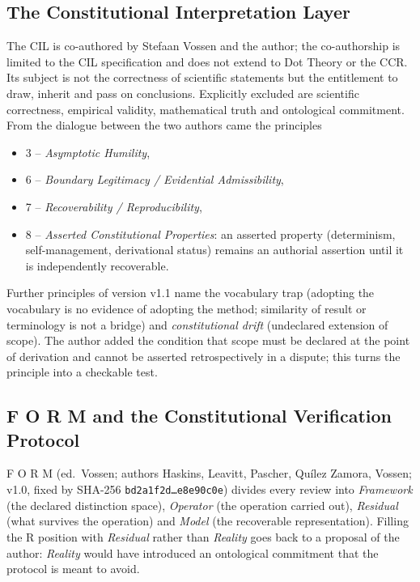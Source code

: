 \subsection{The Constitutional Interpretation Layer}

The CIL is co-authored by Stefaan Vossen and the author; the co-authorship is limited to
the CIL specification and does not extend to Dot Theory or the CCR. Its subject is not
the correctness of scientific statements but the entitlement to draw, inherit and pass on
conclusions. Explicitly excluded are scientific correctness, empirical validity,
mathematical truth and ontological commitment. From the dialogue between the two authors
came the principles
\begin{itemize}
\item 3 -- \emph{Asymptotic Humility},
\item 6 -- \emph{Boundary Legitimacy / Evidential Admissibility},
\item 7 -- \emph{Recoverability / Reproducibility},
\item 8 -- \emph{Asserted Constitutional Properties}: an asserted property (determinism,
  self-management, derivational status) remains an authorial assertion until it is
  independently recoverable.
\end{itemize}
Further principles of version v1.1 name the vocabulary trap (adopting the vocabulary is no
evidence of adopting the method; similarity of result or terminology is not a bridge) and
\emph{constitutional drift} (undeclared extension of scope). The author added the condition
that scope must be declared at the point of derivation and cannot be asserted
retrospectively in a dispute; this turns the principle into a checkable test.

\subsection{F O R M and the Constitutional Verification Protocol}

F O R M (ed.\ Vossen; authors Haskins, Leavitt, Pascher, Quílez Zamora, Vossen; v1.0, fixed
by SHA-256 \texttt{bd2a1f2d\ldots e8e90c0e}) divides every review into \emph{Framework}
(the declared distinction space), \emph{Operator} (the operation carried out),
\emph{Residual} (what survives the operation) and \emph{Model} (the recoverable
representation). Filling the R position with \emph{Residual} rather than \emph{Reality}
goes back to a proposal of the author: \emph{Reality} would have introduced an ontological
commitment that the protocol is meant to avoid.

